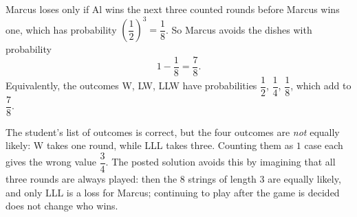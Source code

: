 Marcus loses only if Al wins the next three counted rounds before Marcus wins one, which has probability $\left(\dfrac{1}{2}\right)^3=\dfrac{1}{8}$. So Marcus avoids the dishes with probability
\[
1-\dfrac{1}{8}=\boxed{\dfrac{7}{8}}.
\]
Equivalently, the outcomes W, LW, LLW have probabilities $\dfrac{1}{2}$, $\dfrac{1}{4}$, $\dfrac{1}{8}$, which add to $\dfrac{7}{8}$.

The student's list of outcomes is correct, but the four outcomes are \emph{not} equally likely: W takes one round, while LLL takes three. Counting them as $1$ case each gives the wrong value $\dfrac{3}{4}$. The posted solution avoids this by imagining that all three rounds are always played: then the $8$ strings of length $3$ are equally likely, and only LLL is a loss for Marcus; continuing to play after the game is decided does not change who wins.

